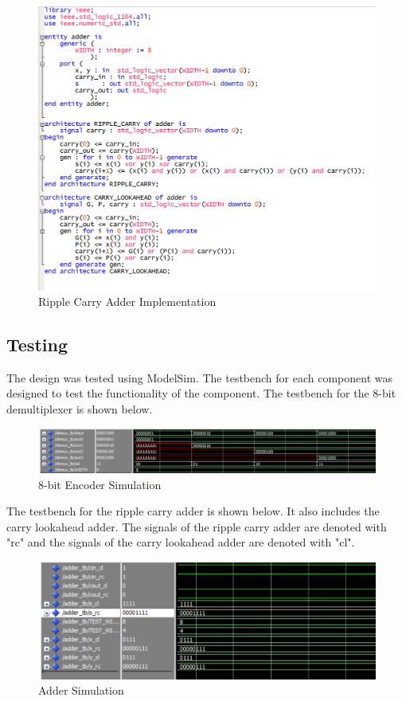\documentclass{article}
\begin{document}
\begin{figure}[H]
  \centering
  \includegraphics[scale=0.5]{adder_impl.png}
  \caption{Ripple Carry Adder Implementation}
\end{figure}
\subsection*{Testing}

The design was tested using ModelSim. The testbench for each component was designed to test the functionality of the component. The testbench for the 8-bit demultiplexer is shown below.

\begin{figure}[H]
  \centering
  \includegraphics[scale=0.5]{demux_tb.png}
  \caption{8-bit Encoder Simulation} 
\end{figure}

The testbench for the ripple carry adder is shown below. It also includes the carry lookahead adder. The signals of the ripple carry adder are denoted with "rc" and the signals of the carry lookahead adder are denoted with "cl".

\begin{figure}[H]
  \centering
  \includegraphics[scale=0.5]{adder_tb1.png}
  \caption{Adder Simulation}
\end{figure}
\end{document}
